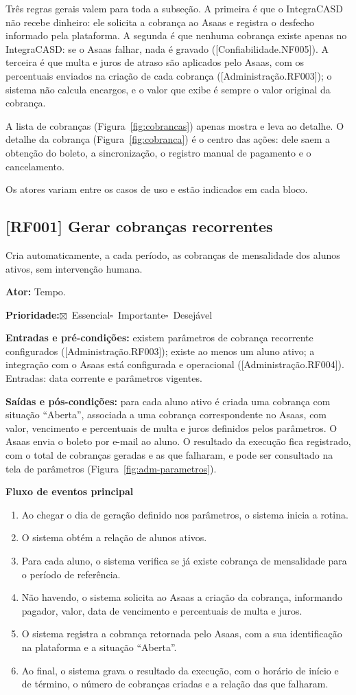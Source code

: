 \documentclass[11pt,a4paper,oneside]{report}
\newcommand{\req}[2]{%
  \subsection*{[#1] #2}%
  \addcontentsline{toc}{subsection}{[#1] #2}}
\newcommand{\marcado}{$\boxtimes$}
\newcommand{\vazio}{$\square$}
\newcommand{\prioE}{\par\textbf{Prioridade:}\quad\marcado~Essencial\quad\vazio~Importante\quad\vazio~Desejável\par}
\newcommand{\ator}[1]{\par\textbf{Ator:} #1\par}
\newcommand{\entradas}{\textbf{Entradas e pré-condições:} }
\newcommand{\saidas}{\par\textbf{Saídas e pós-condições:} }
\newcommand{\fluxoprincipal}{\par\textbf{Fluxo de eventos principal}\par}
\begin{document}
Três regras gerais valem para toda a subseção. A primeira é que o IntegraCASD não recebe dinheiro:
ele solicita a cobrança ao Asaas e registra o desfecho informado pela plataforma. A segunda é que
nenhuma cobrança existe apenas no IntegraCASD: se o Asaas falhar, nada é gravado
([Confiabilidade.NF005]). A terceira é que multa e juros de atraso são aplicados pelo Asaas, com os
percentuais enviados na criação de cada cobrança ([Administração.RF003]); o sistema não calcula
encargos, e o valor que exibe é sempre o valor original da cobrança.

A lista de cobranças (Figura~\ref{fig:cobrancas}) apenas mostra e leva ao detalhe. O detalhe da
cobrança (Figura~\ref{fig:cobranca}) é o centro das ações: dele saem a obtenção do boleto, a
sincronização, o registro manual de pagamento e o cancelamento.

Os atores variam entre os casos de uso e estão indicados em cada bloco.

\req{RF001}{Gerar cobranças recorrentes}

Cria automaticamente, a cada período, as cobranças de mensalidade dos alunos ativos, sem intervenção
humana.

\ator{Tempo.}
\prioE

\entradas existem parâmetros de cobrança recorrente configurados ([Administração.RF003]); existe
ao menos um aluno ativo; a integração com o Asaas está configurada e operacional
([Administração.RF004]). Entradas: data corrente e parâmetros vigentes.

\saidas para cada aluno ativo é criada uma cobrança com situação ``Aberta'', associada a uma
cobrança correspondente no Asaas, com valor, vencimento e percentuais de multa e juros definidos
pelos parâmetros. O Asaas envia o boleto por e-mail ao aluno. O resultado da execução fica
registrado, com o total de cobranças geradas e as que falharam, e pode ser consultado na tela de
parâmetros (Figura~\ref{fig:adm-parametros}).

\fluxoprincipal
\begin{enumerate}
  \item Ao chegar o dia de geração definido nos parâmetros, o sistema inicia a rotina.
  \item O sistema obtém a relação de alunos ativos.
  \item Para cada aluno, o sistema verifica se já existe cobrança de mensalidade para o período de
        referência.
  \item Não havendo, o sistema solicita ao Asaas a criação da cobrança, informando pagador, valor,
        data de vencimento e percentuais de multa e juros.
  \item O sistema registra a cobrança retornada pelo Asaas, com a sua identificação na plataforma e
        a situação ``Aberta''.
  \item Ao final, o sistema grava o resultado da execução, com o horário de início e de término, o
        número de cobranças criadas e a relação das que falharam.
\end{enumerate}
\end{document}
